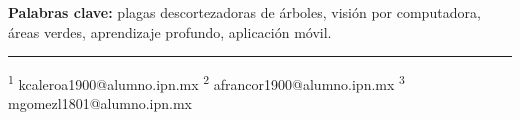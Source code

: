 \begin{titlepage}
    \vspace{1.0cm}

    \noindent
    {\fontsize{12}{15}\selectfont
    \textbf{Palabras clave:} plagas descortezadoras de árboles, visión por computadora, áreas verdes, aprendizaje profundo, aplicación móvil.
    \par}

    \vfill

    \noindent\rule{0.75\textwidth}{0.4pt}

    {\fontsize{10}{12}\selectfont
    \textsuperscript{1} kcaleroa1900@alumno.ipn.mx \hspace{0.8cm}
    \textsuperscript{2} afrancor1900@alumno.ipn.mx \hspace{0.8cm}
    \textsuperscript{3} mgomezl1801@alumno.ipn.mx
    }
\end{titlepage}